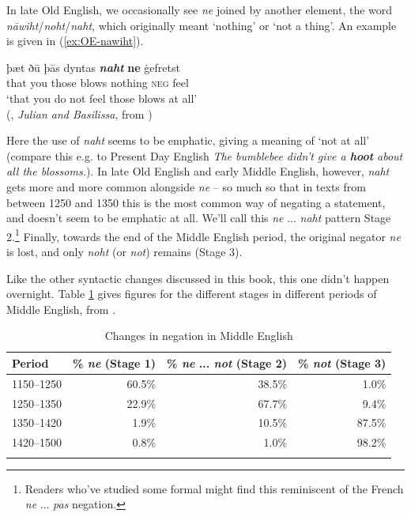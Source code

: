In late Old English, we occasionally see \emph{ne} joined by another element, the word \emph{nāwiht}/\emph{noht}/\emph{naht}, which originally meant `nothing' or `not a thing'. An example is given in (\ref{ex:OE-nawiht}).

\begin{exe}
    \ex\label{ex:OE-nawiht}
    \gll þæt ðū þās dyntas \emph{\textbf{naht}} \textbf{ne} ġefretst\\
    that you those blows nothing \textsc{neg} feel\\
    \trans `that you do not feel those blows at all'\\
    (, \emph{Julian and Basilissa}, from \citealp[486]{Willis2016})
\end{exe}

\noindent Here the use of \emph{naht} seems to be emphatic, giving a meaning of `not at all' (compare this e.g. to Present Day English \textit{The bumblebee didn't give a \textbf{hoot} about all the blossoms.}). In late Old English and early Middle English, however, \emph{naht} gets more and more common alongside \emph{ne} -- so much so that in texts from between 1250 and 1350 this is the most common way of negating a statement, and doesn't seem to be emphatic at all. We'll call this \emph{ne} ... \emph{naht} pattern Stage 2.\footnote{Readers who've studied some formal  might find this reminiscent of the French \emph{ne} ... \emph{pas} negation.} Finally, towards the end of the Middle English period, the original negator \emph{ne} is lost, and only \emph{noht} (or \emph{not}) remains (Stage 3).

Like the other syntactic changes discussed in this book, this one didn't happen overnight. Table \ref{tab:OE-ME-negation} gives figures for the different stages in different periods of Middle English, from \citet{Wallage2008}.

\begin{table}
    \caption{Changes in negation in Middle English \citep[645]{Wallage2008}}\label{tab:OE-ME-negation}
  \begin{tabular}{lrrr}
\lsptoprule
 Period & \% \emph{ne} (Stage 1) & \% \emph{ne} ... \emph{not} (Stage 2) & \% \emph{not} (Stage 3)\\
    \midrule
    1150--1250 & 60.5\% & 38.5\% & 1.0\%\\
    1250--1350 & 22.9\% & 67.7\% & 9.4\%\\ 
    1350--1420 & 1.9\% & 10.5\% & 87.5\%\\
    1420--1500 & 0.8\% & 1.0\% & 98.2\%\\
    \lspbottomrule
  \end{tabular}
\end{table}

